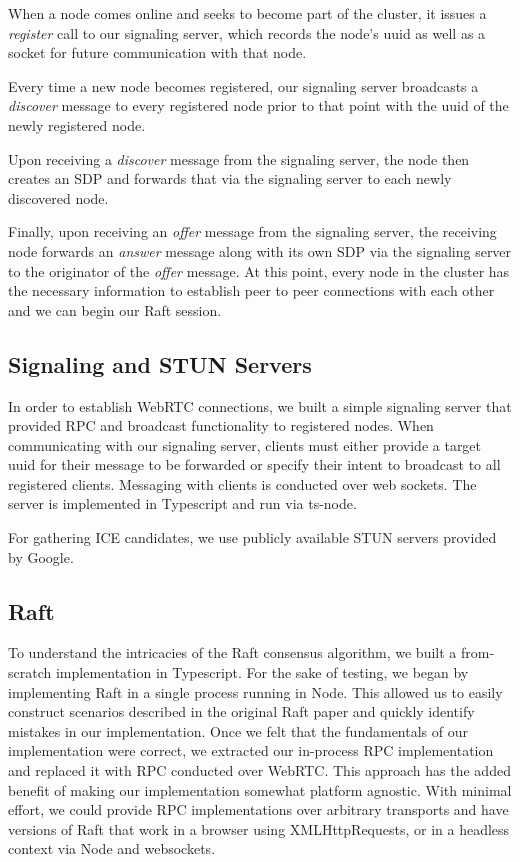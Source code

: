 \documentclass[11pt,twocolumn]{article}
\begin{document}
When a node comes online and seeks to become part of the cluster, it issues a \textit{register} call to our signaling server, which records the node's uuid as well as a socket for future communication with that node.

Every time a new node becomes registered, our signaling server broadcasts a \textit{discover} message to every registered node prior to that point with the uuid of the newly registered node.

Upon receiving a \textit{discover} message from the signaling server, the node then creates an SDP and forwards that via the signaling server to each newly discovered node.

Finally, upon receiving an \textit{offer} message from the signaling server, the receiving node forwards an \textit{answer} message along with its own SDP via the signaling server to the originator of the \textit{offer} message. At this point, every node in the cluster has the necessary information to establish peer to peer connections with each other and we can begin our Raft session.


\subsection{Signaling and STUN Servers}
In order to establish WebRTC connections, we built a simple signaling server that provided RPC and broadcast functionality to registered nodes. When communicating with our signaling server, clients must either provide a target uuid for their message to be forwarded or specify their intent to broadcast to all registered clients. Messaging with clients is conducted over web sockets. The server is implemented in Typescript and run via ts-node.

For gathering ICE candidates, we use publicly available STUN servers provided by Google.

\subsection{Raft}
To understand the intricacies of the Raft consensus algorithm, we built a from-scratch implementation in Typescript. For the sake of testing, we began by implementing Raft in a single process running in Node. This allowed us to easily construct scenarios described in the original Raft paper and quickly identify mistakes in our implementation. Once we felt that the fundamentals of our implementation were correct, we extracted our in-process RPC implementation and replaced it with RPC conducted over WebRTC. This approach has the added benefit of making our implementation somewhat platform agnostic. With minimal effort, we could provide RPC implementations over arbitrary transports and have versions of Raft that work in a browser using XMLHttpRequests, or in a headless context via Node and websockets.
\end{document}

